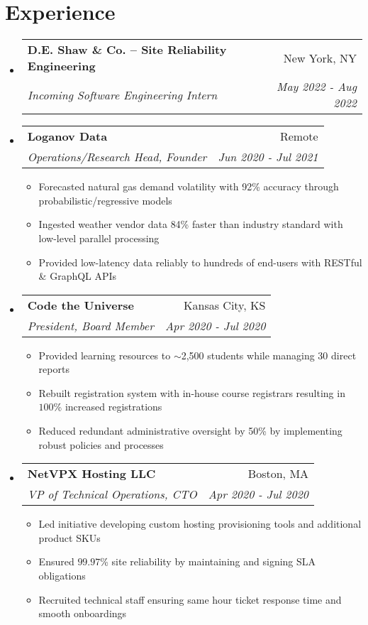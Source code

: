 \documentclass[a4paper,11pt]{extarticle}
\makeatletter
\newcommand{\resumeItem}[1]{
	\item\small{
		#1 \vspace{-2pt}
	}
}
\newcommand{\resumeSubheading}[4]{
	\vspace{-1pt}\item
		\begin{tabular*}{0.97\textwidth}{l@{\extracolsep{\fill}}r}
			\textbf{#1} & #2 \\
			\textit{#3} & \textit{#4} \\
		\end{tabular*}\vspace{-3pt}
}
\newcommand{\resumeSubHeadingListStart}{\begin{itemize}[leftmargin=0.15in,label={}]}
\newcommand{\resumeSubHeadingListEnd}{\end{itemize}}
\newcommand{\resumeItemListStart}{\begin{itemize}\vspace{-3pt}}
\newcommand{\resumeItemListEnd}{\end{itemize}\vspace{-3pt}}
\makeatother
\begin{document}
\section{Experience}
	\resumeSubHeadingListStart
	\resumeSubheading{D.E. Shaw \& Co. -- Site Reliability Engineering}
		{New York, NY}
		{Incoming Software Engineering Intern}{May 2022 - Aug 2022}
		\vspace{-1mm}
		\resumeSubheading{Loganov Data}{Remote}
		{Operations/Research Head, Founder}{Jun 2020 - Jul 2021}
		\resumeItemListStart
			\resumeItem{Forecasted natural gas demand volatility with 92\%
				accuracy through probabilistic/regressive models}
			\resumeItem{Ingested weather vendor data 84\% faster than industry
				standard with low-level parallel processing}
			\resumeItem{Provided low-latency data reliably to hundreds of
				end-users with RESTful \& GraphQL APIs}
		\resumeItemListEnd
		\resumeSubheading{Code the Universe}{Kansas City, KS}
		{President, Board Member}{Apr 2020 - Jul 2020}
		\resumeItemListStart
			\resumeItem{Provided learning resources to $\sim$2,500
				students while managing 30 direct reports}
			\resumeItem{Rebuilt registration system with in-house course
				registrars resulting in $100$\% increased registrations}
			\resumeItem{Reduced redundant administrative oversight by 50\% by
				implementing robust policies and processes}
		\resumeItemListEnd
		\resumeSubheading{NetVPX Hosting LLC}{Boston, MA}
		{VP of Technical Operations, CTO}{Apr 2020 - Jul 2020}
		\resumeItemListStart
			\resumeItem{Led initiative developing custom hosting provisioning
				tools and additional product SKUs}
			\resumeItem{Ensured $99.97$\% site reliability by maintaining
				and signing SLA obligations}
			\resumeItem{Recruited technical staff ensuring same hour ticket
				response time and smooth onboardings}
		\resumeItemListEnd
	\resumeSubHeadingListEnd
\end{document}
